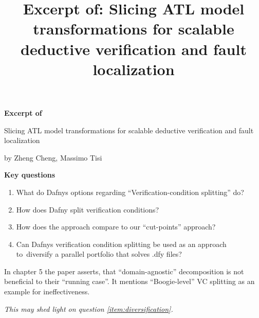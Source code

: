 \documentclass{scrartcl}
\title{Excerpt of: Slicing ATL model transformations for scalable deductive verification
and fault localization}
\begin{document}
\begin{center}
    \Large{\textbf{Excerpt of}}

    \LARGE{Slicing ATL model transformations for scalable deductive verification
    and fault localization}

    \large{by Zheng Cheng, Massimo Tisi}
\end{center}

\vspace{1cm}

\begin{addmargin}[0.2\linewidth]{0.2\linewidth}
    \begin{center}
        \textbf{Key questions}
    \end{center}
    \begin{enumerate}[i]
        \item What do Dafnys options regarding \enquote{Verification-condition splitting} do?
        \item How does Dafny split verification conditions?
        \item How does the approach compare to our \enquote{cut-points} approach?
        \item Can Dafnys verification condition splitting be used as an approach to\
            diversify a parallel portfolio that solves .dfy files? \label{item:diversification}
    \end{enumerate}
\end{addmargin}

\vspace{1cm}

In chapter 5 the paper asserts, that \enquote{domain-agnostic} decomposition
is not beneficial to their \enquote{running case}.
It mentions \enquote{Boogie-level} VC splitting as an example for ineffectiveness.

\textit{This may shed light on question \ref{item:diversification}.}
\end{document}
